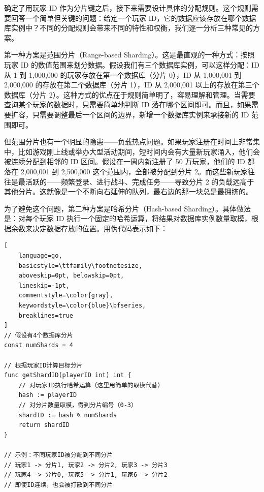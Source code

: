 确定了用玩家 ID 作为分片键之后，接下来需要设计具体的分配规则。这个规则需要回答一个简单但关键的问题：给定一个玩家 ID，它的数据应该存放在哪个数据库实例中？不同的分配规则会带来不同的特性和权衡，我们逐一分析三种常见的方案。

第一种方案是范围分片（Range-based Sharding）。这是最直观的一种方式：按照玩家 ID 的数值范围来划分数据。假设我们有三个数据库实例，可以这样分配：ID 从 1 到 1,000,000 的玩家存放在第一个数据库（分片 0），ID 从 1,000,001 到 2,000,000 的存放在第二个数据库（分片 1），ID 从 2,000,001 以上的存放在第三个数据库（分片 2）。这种方式的优点在于规则简单明了，容易理解和管理。当需要查询某个玩家的数据时，只需要简单地判断 ID 落在哪个区间即可。而且，如果需要扩容，只需要调整最后一个区间的边界，新增一个数据库实例来承接新的 ID 范围即可。

但范围分片也有一个明显的隐患——负载热点问题。如果玩家注册在时间上非常集中，比如游戏刚上线或举办大型活动期间，短时间内会有大量新玩家涌入，他们会被连续分配到相邻的 ID 区间。假设在一周内新注册了 50 万玩家，他们的 ID 都落在 2,000,001 到 2,500,000 这个范围内，全部被分配到分片 2。而这些新玩家往往是最活跃的——频繁登录、进行战斗、完成任务——导致分片 2 的负载远高于其他分片。这就像是一个不断向右延伸的队列，最右边的那一块总是最拥挤的。


为了避免这个问题，第二种方案是哈希分片（Hash-based Sharding）。具体做法是：对每个玩家 ID 执行一个固定的哈希运算，将结果对数据库实例数量取模，根据余数来决定数据存放的位置。用伪代码表示如下：

\begin{tcolorbox}[title=哈希分片的路由计算]
\begin{lstlisting}[
    language=go,
    basicstyle=\ttfamily\footnotesize,
    aboveskip=0pt, belowskip=0pt,
    lineskip=-1pt,
    commentstyle=\color{gray},
    keywordstyle=\color{blue}\bfseries,
    breaklines=true
]
// 假设有4个数据库分片
const numShards = 4

// 根据玩家ID计算目标分片
func getShardID(playerID int) int {
    // 对玩家ID执行哈希运算（这里用简单的取模代替）
    hash := playerID
    // 对分片数量取模，得到分片编号（0-3）
    shardID := hash % numShards
    return shardID
}

// 示例：不同玩家ID被分配到不同分片
// 玩家1 -> 分片1, 玩家2 -> 分片2, 玩家3 -> 分片3
// 玩家4 -> 分片0, 玩家5 -> 分片1, 玩家6 -> 分片2
// 即使ID连续，也会被打散到不同分片
\end{lstlisting}
\end{tcolorbox}

